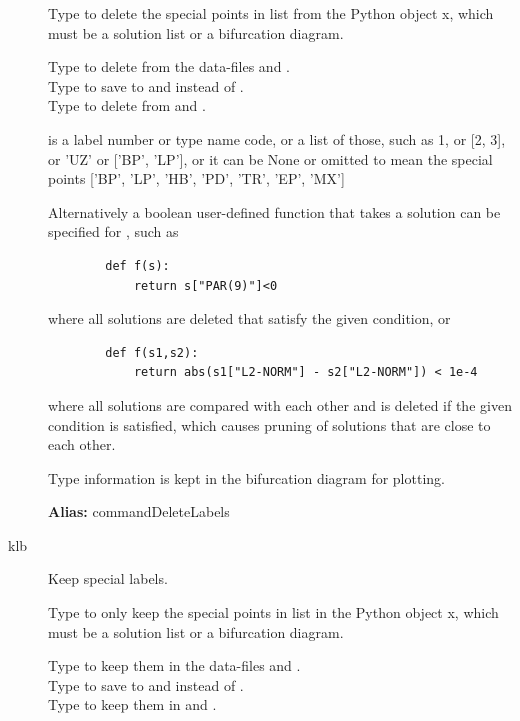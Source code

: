 \documentclass[12pt]{report}
\begin{document}
\begin{description}
    Type  to delete the special points in list from
    the Python object x, which must be a solution list or a bifurcation diagram.

    Type  to delete from the data-files 
     and .\\
    Type  to save to  and
       instead of .\\
    Type  to delete from  and .

     is a label number or type name code, or a list of those,
    such as 1, or [2, 3], or 'UZ' or ['BP', 'LP'], or it can be None or
    omitted to mean the special points ['BP', 'LP', 'HB', 'PD', 'TR',
    'EP', 'MX']

    Alternatively a boolean user-defined function  that
    takes a solution can be specified for , such as
\begin{verbatim}
        def f(s):
            return s["PAR(9)"]<0
\end{verbatim}
    where all solutions are deleted that satisfy the given condition, or
\begin{verbatim}
        def f(s1,s2):
            return abs(s1["L2-NORM"] - s2["L2-NORM"]) < 1e-4
\end{verbatim}
    where all solutions are compared with each other and 
    is deleted if the given condition is satisfied, which causes
    pruning of solutions that are close to each other.

    Type information is kept in the bifurcation diagram for plotting.

\textbf{Alias:} commandDeleteLabels

\item[klb]
Keep special labels.

    Type  to only keep the special points in list in
    the Python object x, which must be a solution list or a bifurcation diagram.

    Type  to keep them in the data-files
     and .\\
    Type  to save to  and
       instead of .\\
    Type  to keep them in  and .


\end{description}
\end{document}
